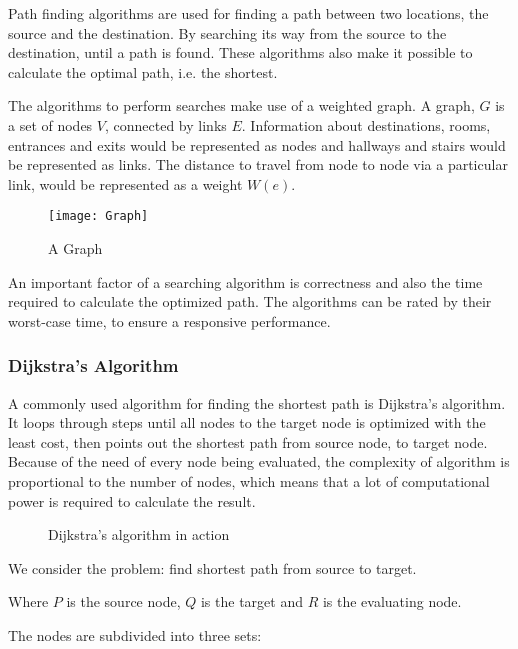   Path finding algorithms are used for finding a path between two locations, the source and the destination. By searching its way from the source to the destination, until a path is found. These algorithms also make it possible to calculate the optimal path, i.e. the shortest.

  The algorithms to perform searches make use of a weighted graph. A graph, $G$ is a set of nodes $V$, connected by links $E$.
  Information about destinations, rooms, entrances and exits would be represented as nodes and hallways and stairs would be represented as links. The distance to travel from node to node via a particular link, would be represented as a weight $W(e)$.

  \begin{figure}[ht!]
    \centering
    \texttt{[image: Graph]}
    \caption{A Graph}
    \label{overflow}
  \end{figure}

  An important factor of a searching algorithm is correctness and also the time required to calculate the optimized path.
  The algorithms can be rated by their worst-case time, to ensure a responsive performance.

  \subsubsection{Dijkstra's Algorithm}

  A commonly used algorithm for finding the shortest path is Dijkstra's algorithm. It loops through steps until all nodes to the target node is optimized with the least cost, then points out the shortest path from source node, to target node. Because of the need of every node being evaluated, the complexity of algorithm is proportional to the number of nodes, which means that a lot of computational power is required to calculate the result.  \cite{Dijkstra}

  \begin{figure}[ht!]
    \centering
    \caption{Dijkstra's algorithm in action}
    \label{overflow}
  \end{figure}

  We consider the problem: find shortest path from source to target.

  Where $P$ is the source node, $Q$ is the target and $R$ is the evaluating node.

  The nodes are subdivided into three sets:

